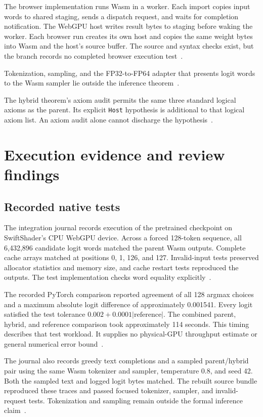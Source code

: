 \documentclass[11pt]{article}
\newcommand{\code}[1]{\texttt{#1}}
\begin{document}
The browser implementation runs Wasm in a worker.  Each import copies input words to shared staging, sends a dispatch request, and waits for completion notification.  The WebGPU host writes result bytes to staging before waking the worker.  Each browser run creates its own host and copies the same weight bytes into Wasm and the host's source buffer.  The source and syntax checks exist, but the branch records no completed browser execution test~\cite{host,journal}.

Tokenization, sampling, and the FP32-to-FP64 adapter that presents logit words to the Wasm sampler lie outside the inference theorem~\cite{build}.

The hybrid theorem's axiom audit permits the same three standard logical axioms as the parent.  Its explicit \code{Host} hypothesis is additional to that logical axiom list.  An axiom audit alone cannot discharge the hypothesis~\cite{composition}.


\section{Execution evidence and review findings}

\subsection{Recorded native tests}

The integration journal records execution of the pretrained checkpoint on SwiftShader's CPU WebGPU device.  Across a forced 128-token sequence, all 6,432,896 candidate logit words matched the parent Wasm outputs.  Complete cache arrays matched at positions 0, 1, 126, and 127.  Invalid-input tests preserved allocator statistics and memory size, and cache restart tests reproduced the outputs.  The test implementation checks word equality explicitly~\cite{journal,tests}.

The recorded PyTorch comparison reported agreement of all 128 argmax choices and a maximum absolute logit difference of approximately 0.001541.  Every logit satisfied the test tolerance $0.002+0.0001|\text{reference}|$.  The combined parent, hybrid, and reference comparison took approximately 114 seconds.  This timing describes that test workload.  It supplies no physical-GPU throughput estimate or general numerical error bound~\cite{journal,tests}.

The journal also records greedy text completions and a sampled parent/hybrid pair using the same Wasm tokenizer and sampler, temperature 0.8, and seed 42.  Both the sampled text and logged logit bytes matched.  The rebuilt source bundle reproduced these traces and passed focused tokenizer, sampler, and invalid-request tests.  Tokenization and sampling remain outside the formal inference claim~\cite{journal}.
\end{document}
